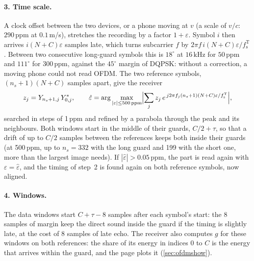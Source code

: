 \documentclass[11pt,a4paper]{article}
\newcommand{\kHz}{\,\mathrm{kHz}}
\newcommand{\fsT}{f_{\mathrm{s}}^{\mathrm{T}}}
\theoremstyle{remark}
\begin{document}
\paragraph{3. Time scale.}
A clock offset between the two devices, or a phone moving at $v$ (a scale of $v/c$: $290$\,ppm at $0.1$\,m/s), stretches the recording by a factor $1 + \varepsilon$. Symbol $i$ then arrives $i(N + C)\varepsilon$ samples late, which turns subcarrier $f$ by $2\pi f\, i(N + C)\varepsilon/\fsT$. Between two consecutive long-guard symbols this is $18^\circ$ at $16\kHz$ for $50$\,ppm and $111^\circ$ for 300\,ppm, against the $45^\circ$ margin of DQPSK: without a correction, a moving phone could not read OFDM. The two reference symbols, $(n_s + 1)(N + C)$ samples apart, give the receiver
\begin{equation}
z_j = Y_{n_s+1,j}\, Y_{0,j}^{*}, \qquad \hat\varepsilon = \arg\max_{|\varepsilon| \le 500\,\mathrm{ppm}} \Bigl|\sum_j z_j\, e^{\,j 2\pi f_j (n_s + 1)(N + C)\varepsilon/\fsT}\Bigr|,
\label{eq:ofdmeps}
\end{equation}
searched in steps of 1\,ppm and refined by a parabola through the peak and its neighbours. Both windows start in the middle of their guards, $C/2 + \tau$, so that a drift of up to $C/2$ samples between the references keeps both inside their guards (at 500\,ppm, up to $n_s = 332$ with the long guard and 199 with the short one, more than the largest image needs). If $|\hat\varepsilon| > 0.05$\,ppm, the part is read again with $\varepsilon = \hat\varepsilon$, and the timing of step~2 is found again on both reference symbols, now aligned.

\paragraph{4. Windows.}
The data windows start $C + \tau - 8$ samples after each symbol's start: the 8 samples of margin keep the direct sound inside the guard if the timing is slightly late, at the cost of 8 samples of late echo. The receiver also computes $g$ for these windows on both references: the share of its energy in indices $0$ to $C$ is the energy that arrives within the guard, and the page plots it (\cref{sec:ofdmshow}).
\end{document}
